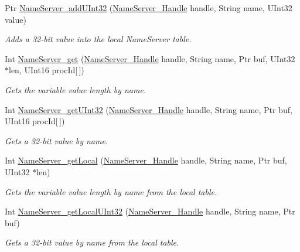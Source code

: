 \begin{DoxyCompactItemize}
Ptr \hyperlink{_name_server_8h_ac130195a04a34dfa2daba6ec3fff65d6}{NameServer\_\-addUInt32} (\hyperlink{_name_server_8h_a99fa93c4ee4169db90162b523d9152d4}{NameServer\_\-Handle} handle, String name, UInt32 value)
\begin{DoxyCompactList}\small\item\em Adds a 32-\/bit value into the local NameServer table. \item\end{DoxyCompactList}\item 
Int \hyperlink{_name_server_8h_a5f1013e57e7c5da9f003063d70a76e01}{NameServer\_\-get} (\hyperlink{_name_server_8h_a99fa93c4ee4169db90162b523d9152d4}{NameServer\_\-Handle} handle, String name, Ptr buf, UInt32 $\ast$len, UInt16 procId\mbox{[}$\,$\mbox{]})
\begin{DoxyCompactList}\small\item\em Gets the variable value length by name. \item\end{DoxyCompactList}\item 
Int \hyperlink{_name_server_8h_ac3b6fa4f8f0ed572f1a5f6b7cb05679e}{NameServer\_\-getUInt32} (\hyperlink{_name_server_8h_a99fa93c4ee4169db90162b523d9152d4}{NameServer\_\-Handle} handle, String name, Ptr buf, UInt16 procId\mbox{[}$\,$\mbox{]})
\begin{DoxyCompactList}\small\item\em Gets a 32-\/bit value by name. \item\end{DoxyCompactList}\item 
Int \hyperlink{_name_server_8h_a46d3826bc4ef4bc6cc45d5287c697122}{NameServer\_\-getLocal} (\hyperlink{_name_server_8h_a99fa93c4ee4169db90162b523d9152d4}{NameServer\_\-Handle} handle, String name, Ptr buf, UInt32 $\ast$len)
\begin{DoxyCompactList}\small\item\em Gets the variable value length by name from the local table. \item\end{DoxyCompactList}\item 
Int \hyperlink{_name_server_8h_a9e824f111db640d1bce81bfe25963b76}{NameServer\_\-getLocalUInt32} (\hyperlink{_name_server_8h_a99fa93c4ee4169db90162b523d9152d4}{NameServer\_\-Handle} handle, String name, Ptr buf)
\begin{DoxyCompactList}\small\item\em Gets a 32-\/bit value by name from the local table. \item\end{DoxyCompactList}\item 

\end{DoxyCompactItemize}
